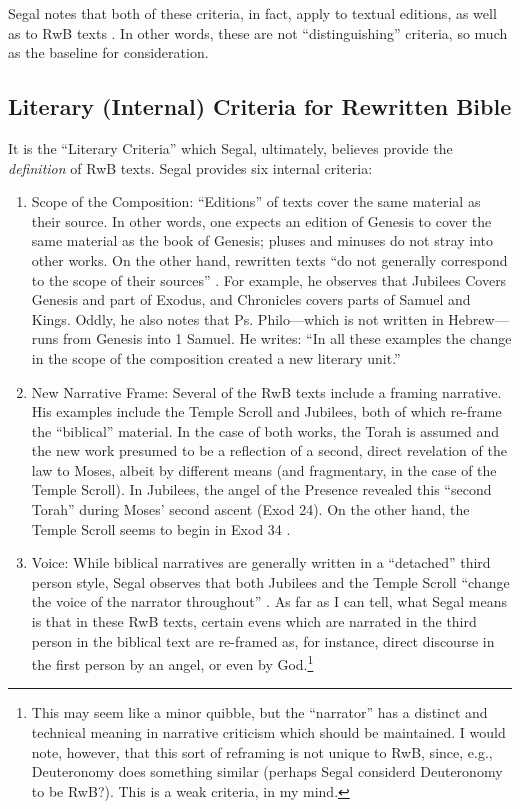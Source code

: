 Segal notes that both of these criteria, in fact, apply to textual
editions, as well as to RwB texts \autocite[20]{segal_henze2005}. In
other words, these are not ``distinguishing'' criteria, so much as the
baseline for consideration.

\subsection{Literary (Internal) Criteria for Rewritten
Bible}\label{literary-internal-criteria-for-rewritten-bible}

It is the ``Literary Criteria'' which Segal, ultimately, believes
provide the \emph{definition} of RwB
texts.\autocite[20]{segal_henze2005} Segal provides six internal
criteria:

\begin{enumerate}
\def\labelenumi{\arabic{enumi}.}
\item
  Scope of the Composition: ``Editions'' of texts cover the same
  material as their source. In other words, one expects an edition of
  Genesis to cover the same material as the book of Genesis; pluses and
  minuses do not stray into other works. On the other hand, rewritten
  texts ``do not generally correspond to the scope of their sources''
  \autocite[20]{segal_henze2005}. For example, he observes that Jubilees
  Covers Genesis and part of Exodus, and Chronicles covers parts of
  Samuel and Kings. Oddly, he also notes that Ps. Philo---which is not
  written in Hebrew---runs from Genesis into 1 Samuel. He writes: ``In
  all these examples the change in the scope of the composition created
  a new literary unit.'' \autocite[20--21]{segal_henze2005}
\item
  New Narrative Frame: Several of the RwB texts include a framing
  narrative. His examples include the Temple Scroll and Jubilees, both
  of which re-frame the ``biblical'' material. In the case of both
  works, the Torah is assumed and the new work presumed to be a
  reflection of a second, direct revelation of the law to Moses, albeit
  by different means (and fragmentary, in the case of the
  Temple Scroll). In Jubilees, the angel of the Presence revealed this
  ``second Torah'' during Moses' second ascent (Exod 24). On the other
  hand, the Temple Scroll seems to begin in Exod 34
  \autocite[22]{segal_henze2005}.
\item
  Voice: While biblical narratives are generally written in a
  ``detached'' third person style, Segal observes that both Jubilees and
  the Temple Scroll ``change the voice of the narrator throughout''
  \autocite[22]{segal_henze2005}. As far as I can tell, what Segal means
  is that in these RwB texts, certain evens which are narrated in the
  third person in the biblical text are re-framed as, for instance,
  direct discourse in the first person by an angel, or even by
  God.\footnote{This may seem like a minor quibble, but the ``narrator''
    has a distinct and technical meaning in narrative criticism which
    should be maintained. I would note, however, that this sort of
    reframing is not unique to RwB, since, e.g., Deuteronomy does
    something similar (perhaps Segal considerd Deuteronomy to be RwB?).
    This is a weak criteria, in my mind.}
\end{enumerate}

